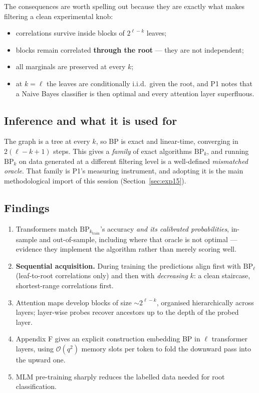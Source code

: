 \documentclass[11pt]{article}
\theoremstyle{remark}
\begin{document}
The consequences are worth spelling out because they are exactly what makes
filtering a clean experimental knob:
\begin{itemize}[nosep]
  \item correlations survive inside blocks of $2^{\ell-k}$ leaves;
  \item blocks remain correlated \textbf{through the root} --- they are not
    independent;
  \item all marginals are preserved at every $k$;
  \item at $k=\ell$ the leaves are conditionally i.i.d.\ given the root, and P1
    notes that a Naive Bayes classifier is then optimal and every attention
    layer superfluous.
\end{itemize}

\subsection{Inference and what it is used for}

The graph is a tree at every $k$, so BP is exact and linear-time, converging in
$2(\ell-k+1)$ steps. This gives a \emph{family} of exact algorithms
$\mathrm{BP}_k$, and running $\mathrm{BP}_k$ on data generated at a different
filtering level is a well-defined \emph{mismatched oracle}. That family is P1's
measuring instrument, and adopting it is the main methodological import of this
session (Section~\ref{sec:exp15}).

\subsection{Findings}

\begin{enumerate}[nosep]
  \item Transformers match $\mathrm{BP}_{k_{\mathrm{train}}}$'s accuracy
    \emph{and its calibrated probabilities}, in-sample and out-of-sample,
    including where that oracle is not optimal --- evidence they implement the
    algorithm rather than merely scoring well.
  \item \textbf{Sequential acquisition.} During training the predictions align
    first with $\mathrm{BP}_\ell$ (leaf-to-root correlations only) and then with
    \emph{decreasing} $k$: a clean staircase, shortest-range correlations first.
  \item Attention maps develop blocks of size $\sim 2^{\ell-k}$, organised
    hierarchically across layers; layer-wise probes recover ancestors up to the
    depth of the probed layer.
  \item Appendix F gives an explicit construction embedding BP in $\ell$
    transformer layers, using $\mathcal O(q^2)$ memory slots per token to fold
    the downward pass into the upward one.
  \item MLM pre-training sharply reduces the labelled data needed for root
    classification.
\end{enumerate}
\end{document}
